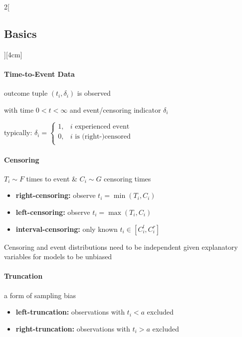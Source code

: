 \documentclass[8pt]{extarticle}
\begin{document}
\begin{multicols}{2}[\subsection{Basics}][4cm] 

\paragraph{Time-to-Event Data} outcome tuple $(t_i, \delta_i)$ is observed 
 
\noindent with time $0<t<\infty$ and event/censoring indicator $\delta_i$ 

\vspace{0.5em}
\noindent typically: $\delta_i=  \left\{
\begin{array}{rl}
1, & i\text{ experienced event} \\
0, & i\text{ is (right-)censored} \\
\end{array}
\right. $ 



\paragraph{Censoring}

$T_i \sim F$ times to event \& $C_i \sim G$  censoring times

\begin{itemize}[itemsep=-0.3em]
\item \textbf{right-censoring:} observe $t_i = \min(T_i, C_i)$
\item \textbf{left-censoring:} observe $t_i = \max(T_i, C_i)$
\item \textbf{interval-censoring:} only known $t_i \in \left[C_i^l, C_i^r\right]$
\end{itemize}

\noindent Censoring and event distributions need to be independent given  explanatory variables for models to be unbiased



\paragraph{Truncation} a form of sampling bias

\begin{itemize}[itemsep=-0.3em]
\item \textbf{left-truncation:} observations with $t_i < a$ excluded
\item \textbf{right-truncation:} observations with $t_i > a$ excluded
\end{itemize}


\end{multicols}
\end{document}
